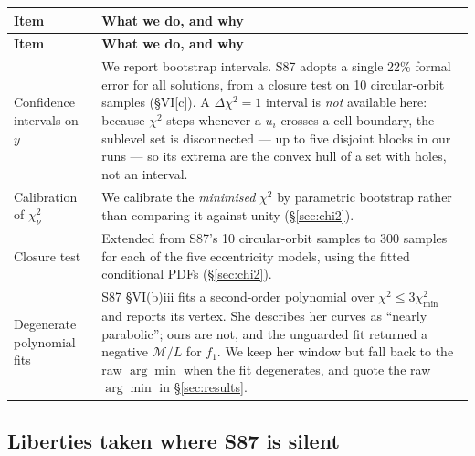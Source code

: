 \documentclass[11pt]{article}
\newcommand{\ML}{\ensuremath{\mathcal{M}/L}}
\begin{document}
\begin{longtable}{p{} p{}}
\toprule
\textbf{Item} & \textbf{What we do, and why} \\
\midrule
\endfirsthead
\toprule
\textbf{Item} & \textbf{What we do, and why} \\
\midrule
\endhead
\bottomrule
\endfoot

Confidence intervals on $y$ &
We report bootstrap intervals. S87 adopts a single 22\% formal error for all
solutions, from a closure test on 10 circular-orbit samples (\S VI[c]). A
$\Delta\chi^2=1$ interval is \emph{not} available here: because $\chi^2$ steps
whenever a $u_i$ crosses a cell boundary, the sublevel set is disconnected ---
up to five disjoint blocks in our runs --- so its extrema are the convex hull
of a set with holes, not an interval. \\[4pt]

Calibration of $\chi^2_\nu$ &
We calibrate the \emph{minimised} $\chi^2$ by parametric bootstrap rather than
comparing it against unity (\S\ref{sec:chi2}). \\[4pt]

Closure test &
Extended from S87's 10 circular-orbit samples to 300 samples for each of the
five eccentricity models, using the fitted conditional PDFs
(\S\ref{sec:chi2}). \\[4pt]

Degenerate polynomial fits &
S87 \S VI(b)iii fits a second-order polynomial over $\chi^2 \le 3\chi^2_{\min}$
and reports its vertex. She describes her curves as ``nearly parabolic''; ours
are not, and the unguarded fit returned a negative \ML{} for $f_1$. We keep her
window but fall back to the raw $\arg\min$ when the fit degenerates, and quote
the raw $\arg\min$ in \S\ref{sec:results}. \\
\end{longtable}

\subsection{Liberties taken where S87 is silent}
\end{document}

